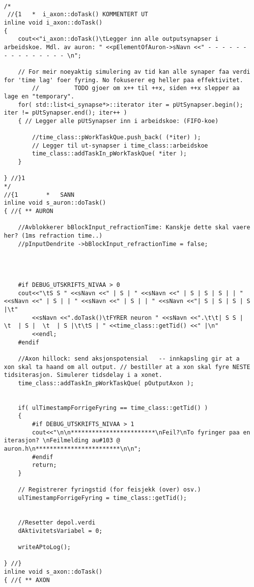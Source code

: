 \begin{lstlisting}

/*
 //{1   *  i_axon::doTask() KOMMENTERT UT
inline void i_axon::doTask()
{
 	cout<<"i_axon::doTask()\tLegger inn alle outputsynapser i arbeidskoe. Mdl. av auron: " <<pElementOfAuron->sNavn <<" - - - - - - - - - - - - - - - \n";

	// For meir noeyaktig simulering av tid kan alle synaper faa verdi for 'time lag' foer fyring. No fokuserer eg heller paa effektivitet. 
		//			TODO gjoer om x++ til ++x, siden ++x slepper aa lage en "temporary".
 	for( std::list<i_synapse*>::iterator iter = pUtSynapser.begin(); iter != pUtSynapser.end(); iter++ )
	{ // Legger alle pUtSynapser inn i arbeidskoe: (FIFO-koe)
		
		//time_class::pWorkTaskQue.push_back( (*iter) );
		// Legger til ut-synapser i time_class::arbeidskoe
		time_class::addTaskIn_pWorkTaskQue( *iter );
	}

} //}1
*/
//{1 		* 	SANN
inline void s_auron::doTask()
{ //{ ** AURON

	//Avblokkerer bBlockInput_refractionTime: Kanskje dette skal vaere her? (1ms refraction time..)
	//pInputDendrite ->bBlockInput_refractionTime = false;




	#if DEBUG_UTSKRIFTS_NIVAA > 0
	cout<<"\tS S " <<sNavn <<" | S | " <<sNavn <<" | S | S | S | | " <<sNavn <<" | S | | " <<sNavn <<" | S | | " <<sNavn <<"| S | S | S | S |\t"
		<<sNavn <<".doTask()\tFYRER neuron " <<sNavn <<".\t\t| S S | \t  | S |  \t  | S |\t\tS | " <<time_class::getTid() <<" |\n"
		<<endl;
	#endif

	//Axon hillock: send aksjonspotensial 	-- innkapsling gir at a xon skal ta haand om all output. // bestiller at a xon skal fyre NESTE tidsiterasjon. Simulerer tidsdelay i a xonet.
	time_class::addTaskIn_pWorkTaskQue( pOutputAxon );


	if( ulTimestampForrigeFyring == time_class::getTid() )
	{
		#if DEBUG_UTSKRIFTS_NIVAA > 1
		cout<<"\n\n************************\nFeil?\nTo fyringer paa en iterasjon? \nFeilmelding au#103 @ auron.h\n************************\n\n";
		#endif
		return;
	}

	// Registrerer fyringstid (for feisjekk (over) osv.) 
	ulTimestampForrigeFyring = time_class::getTid();


	//Resetter depol.verdi 
	dAktivitetsVariabel = 0; 

	writeAPtoLog();

} //}
inline void s_axon::doTask()
{ //{ ** AXON


\end{lstlisting}
